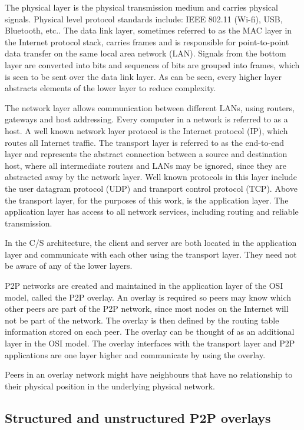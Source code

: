 The physical layer is the physical transmission medium and carries physical signals. Physical level protocol standards include: IEEE 802.11 (Wi-fi), USB, Bluetooth, etc.. The data link layer, sometimes referred to as the MAC layer in the Internet protocol stack, carries frames and is responsible for point-to-point data transfer on the same local area network (LAN). Signals from the bottom layer are converted into bits and sequences of bits are grouped into frames, which is seen to be sent over the data link layer. As can be seen, every higher layer abstracts elements of the lower layer to reduce complexity.

The network layer allows communication between different LANs, using routers, gateways and host addressing. Every computer in a network is referred to as a host. A well known network layer protocol is the Internet protocol (IP), which routes all Internet traffic. The transport layer is referred to as the end-to-end layer and represents the abstract connection between a source and destination host, where all intermediate routers and LANs may be ignored, since they are abstracted away by the network layer. Well known protocols in this layer include the user datagram protocol (UDP) and transport control protocol (TCP). Above the transport layer, for the purposes of this work, is the application layer. The application layer has access to all network services, including routing and reliable transmission.

In the C/S architecture, the client and server are both located in the application layer and communicate with each other using the transport layer. They need not be aware of any of the lower layers.

P2P networks are created and maintained in the application layer of the OSI model, called the P2P overlay. An overlay is required so peers may know which other peers are part of the P2P network, since most nodes on the Internet will not be part of the network. The overlay is then defined by the routing table information stored on each peer. The overlay can be thought of as an additional layer in the OSI model. The overlay interfaces with the transport layer and P2P applications are one layer higher and communicate by using the overlay.

Peers in an overlay network might have neighbours that have no relationship to their physical position in the underlying physical network.

\subsection{Structured and unstructured P2P overlays}
\label{overlays}

